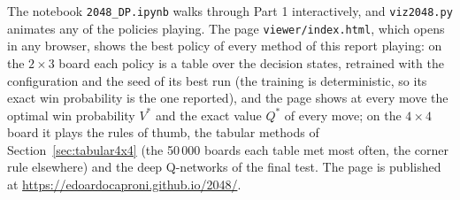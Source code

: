 \documentclass[11pt,a4paper]{article}
\theoremstyle{remark}
\begin{document}
The notebook \texttt{2048\_DP.ipynb} walks through Part 1 interactively, and \texttt{viz2048.py} animates any of the policies playing. The page \texttt{viewer/index.html}, which opens in any browser, shows the best policy of every method of this report playing: on the $2\times3$ board each policy is a table over the decision states, retrained with the configuration and the seed of its best run (the training is deterministic, so its exact win probability is the one reported), and the page shows at every move the optimal win probability $V^*$ and the exact value $Q^*$ of every move; on the $4\times4$ board it plays the rules of thumb, the tabular methods of Section~\ref{sec:tabular4x4} (the 50\,000 boards each table met most often, the corner rule elsewhere) and the deep Q-networks of the final test. The page is published at \url{https://edoardocaproni.github.io/2048/}.



\end{document}
